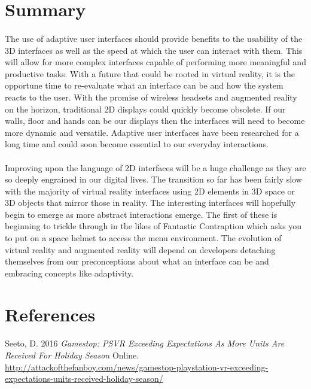 \documentclass[11pt]{article}
\begin{document}
\section{Summary}

\paragraph{}
The use of adaptive user interfaces should provide benefits to the usability of the 3D interfaces as well as the speed at which the user can interact with them. This will allow for more complex interfaces capable of performing more meaningful and productive tasks. With a future that could be rooted in virtual reality, it is the opportune time to re-evaluate what an interface can be and how the system reacts to the user. With the promise of wireless headsets and augmented reality on the horizon, traditional 2D displays could quickly become obsolete. If our walls, floor and hands can be our displays then the interfaces will need to become more dynamic and versatile. Adaptive user interfaces have been researched for a long time and could soon become essential to our everyday interactions.

\paragraph{} 
Improving upon the language of 2D interfaces will be a huge challenge as they are so deeply engrained in our digital lives. The transition so far has been fairly slow with the majority of virtual reality interfaces using 2D elements in 3D space or 3D objects that mirror those in reality. The interesting interfaces will hopefully begin to emerge as more abstract interactions emerge. The first of these is beginning to trickle through in the likes of Fantastic Contraption which asks you to put on a space helmet to access the menu environment. The evolution of virtual reality and augmented reality will depend on developers detaching themselves from our preconceptions about what an interface can be and embracing concepts like adaptivity.

\section{References}

\paragraph{}
Seeto, D. 2016 \emph{Gamestop: PSVR Exceeding Expectations As More Units Are Received For Holiday Season} Online. \url{http://attackofthefanboy.com/news/gamestop-playstation-vr-exceeding-expectations-units-received-holiday-season/} \\
\end{document}
